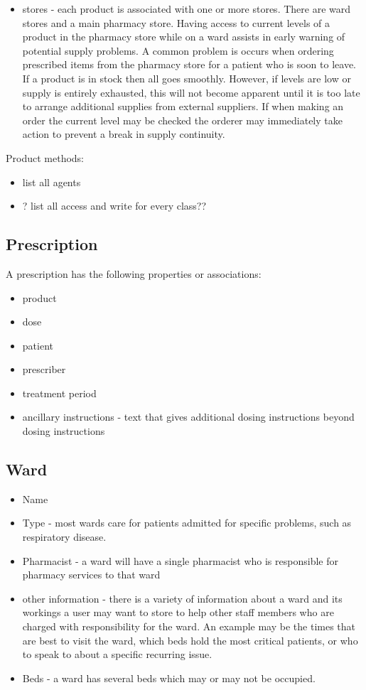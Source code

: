 \documentclass[letterpaper]{amsart}
\begin{document}
\begin{itemize}
    \item stores - each product is associated with one or more stores.  There are ward stores and a main pharmacy store.  Having access to current levels of a product in the pharmacy store while on a ward assists in early warning of potential supply problems.  A common problem is occurs when ordering prescribed items from the pharmacy store for a patient who is soon to leave.  If a product is in stock then all goes smoothly.  However, if levels are low or supply is entirely exhausted, this will not become apparent until it is too late to arrange additional supplies from external suppliers.  If when making an order the current level may be checked the orderer may immediately take action to prevent a break in supply continuity.  
\end{itemize}

Product methods:\\ 
\begin{itemize}
    \item list all agents 
    \item ? list all access and write for every class??
\end{itemize}
\subsection{Prescription}
A prescription has the following properties or associations:
\begin{itemize}
    \item product 
    \item dose 
    \item patient 
    \item prescriber 
    \item treatment period 
    \item ancillary instructions - text that gives additional dosing instructions beyond dosing instructions
\end{itemize}
\subsection{Ward}
\begin{itemize}
    \item Name 
    \item Type - most wards care for patients admitted for specific problems, such as respiratory disease. 
    \item Pharmacist - a ward will have a single pharmacist who is responsible for pharmacy services to that ward 
    \item other information - there is a variety of information about a ward and its workings a user may want to store to help other staff members who are charged with responsibility for the ward.  An example may be the times that are best to visit the ward, which beds hold the most critical patients, or who to speak to about a specific recurring issue. 
    \item Beds - a ward has several beds which may or may not be occupied.
\end{itemize}
\end{document}
